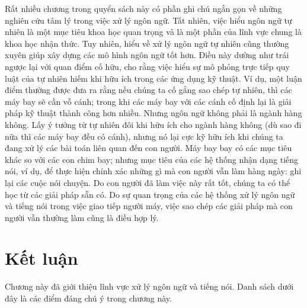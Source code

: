 Rất nhiều chương trong quyển sách này có phần ghi chú ngắn gọn về những nghiên cứu tâm lý trong việc xử lý ngôn ngữ. Tất nhiên, việc hiểu ngôn ngữ tự nhiên là một mục tiêu khoa học quan trọng và là một phần của lĩnh vực chung là khoa học nhận thức. Tuy nhiên, hiểu về xử lý ngôn ngữ tự nhiên cũng thường xuyên giúp xây dựng các mô hình ngôn ngữ tốt hơn. Điều này dường như trái ngược lại với quan điểm cố hữu, cho rằng việc hiểu sự mô phỏng trực tiếp quy luật của tự nhiên hiếm khi hữu ích trong các ứng dụng kỹ thuật. Ví dụ, một luận điểm thường được đưa ra rằng nếu chúng ta cố gắng sao chép tự nhiên, thì các máy bay sẽ cần vỗ cánh; trong khi các máy bay với các cánh cố định lại là giải pháp kỹ thuật thành công hơn nhiều. Nhưng ngôn ngữ không phải là ngành hàng không. Lấy ý tưởng từ tự nhiên đôi khi hữu ích cho ngành hàng không (dù sao đi nữa thì các máy bay đều có cánh), nhưng nó lại cực kỹ hữu ích khi chúng ta đang xử lý các bài toán liên quan đến con người. Máy bay bay có các mục tiêu khác so với các con chim bay; nhưng mục tiêu của các hệ thống nhận dạng tiếng nói, ví dụ, để thực hiện chính xác những gì mà con người vẫn làm hàng ngày: ghi lại các cuộc nói chuyện. Do con người đã làm việc này rất tốt, chúng ta có thể học từ các giải pháp sẵn có. Do sự quan trọng của các hệ thống xử lý ngôn ngữ và tiếng nói trong việc giao tiếp người máy, việc sao chép các giải pháp mà con người vẫn thường làm cũng là điều hợp lý.

\section{Kết luận}

Chương này đã giới thiệu lĩnh vực xử lý ngôn ngữ và tiếng nói. Danh sách dưới đây là các điểm đáng chú ý trong chương này.

